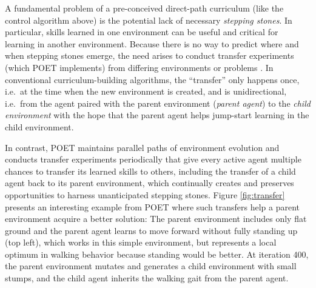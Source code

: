 \documentclass{article}
\newcommand{\ks}[1]{\comments{\textcolor{purple}{[Ken: #1]}}}
\newcommand{\rw}[1]{\comments{\textcolor{blue}{[Rui: #1]}}}
\newcommand{\comments}[1]{#1}
\begin{document}


A fundamental problem of a pre-conceived direct-path curriculum (like the control algorithm above) 
is the potential lack of necessary \emph{stepping stones}. In particular, skills learned in one environment can be useful and critical for learning in another environment. Because there is no way to predict where and when stepping stones emerge, the need arises to conduct transfer experiments (which POET implements) from differing environments or problems \cite{nguyen2016innovative}. In conventional curriculum-building algorithms, the ``transfer'' only happens once, i.e.\ at the time when the new environment is created, and is unidirectional, i.e.\ from the agent paired with the parent environment (\emph{parent agent}) to the \emph{child environment} with the hope that the parent agent helps jump-start learning in the child environment. 


In contrast, POET maintains parallel paths of environment evolution and conducts transfer experiments periodically that give every active agent multiple chances to transfer its learned skills to others, including the transfer of a child agent back to its parent environment, which continually creates and preserves opportunities to harness unanticipated stepping stones. Figure \ref{fig:transfer} presents an interesting example from POET where such transfers help a parent environment acquire a better solution: The parent environment includes only flat ground and the parent agent learns to move forward without fully standing up (top left), which works in this simple environment, but represents a local optimum in walking behavior because standing would be better. At iteration 400, the parent environment mutates and generates a child environment with small stumps, and the child agent inherits the walking gait from the parent agent. 
\end{document}
